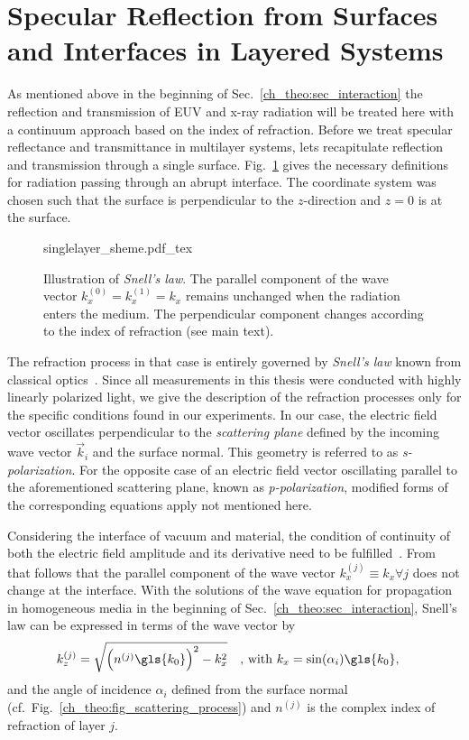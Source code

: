 \section{Specular Reflection from Surfaces and Interfaces in Layered Systems} \label{ch_theo:sec_multilayer}
As mentioned above in the beginning of Sec.~\ref{ch_theo:sec_interaction} the reflection and transmission of EUV and x-ray radiation will be treated here with a continuum approach based on the index of refraction. Before we treat specular reflectance and transmittance in multilayer systems, lets recapitulate reflection and transmission through a single surface. Fig.~\ref{ch_theo:fig_singlelayer_scheme} gives the necessary definitions for radiation passing through an abrupt interface. The coordinate system was chosen such that the surface is perpendicular to the $z$-direction and $z=0$ is at the surface.
\begin{figure}[htb]
    \def\svgwidth{0.57\textwidth}
    {singlelayer_sheme.pdf_tex}
    \caption[Illustration of \emph{Snell's law}.]{Illustration of \emph{Snell's law}. The parallel component of the wave vector $k_x^{(0)} = k_x^{(1)} = k_x$ remains unchanged when the radiation enters the medium. The perpendicular component changes according to the index of refraction (see main text).}
    \label{ch_theo:fig_singlelayer_scheme}
\end{figure}
The refraction process in that case is entirely governed by \emph{Snell's law} known from classical optics~\cite{born_principles_1965}. Since all measurements in this thesis were conducted with highly linearly polarized light, we give the description of the refraction processes only for the specific conditions found in our experiments. In our case, the electric field vector oscillates perpendicular to the \emph{scattering plane} defined by the incoming wave vector $\vec{k}_i$ and the surface normal. This geometry is referred to as \emph{s-polarization}. For the opposite case of an electric field vector oscillating parallel to the aforementioned scattering plane, known as \emph{p-polarization}, modified forms of the corresponding equations apply not mentioned here.

Considering the interface of vacuum and material, the condition of continuity of both the electric field amplitude and its derivative need to be fulfilled~\cite{born_principles_1965, gibaud_specular_2009}. From that follows that the parallel component of the wave vector $k_x^{(j)} \equiv k_x \forall j$ does not change at the interface. With the solutions of the wave equation for propagation in homogeneous media in the beginning of Sec.~\ref{ch_theo:sec_interaction}, Snell's law can be expressed in terms of the wave vector by
\begin{align}
k_z^{(j)} &= \sqrt{\Big(n^{(j)} \gls{k_0}\Big)^2 - k_x^2} \quad \text{, with } k_x = \sin(\alpha_i) \gls{k_0} \text{,} \label{ch_theo:eqn_snells_law}
\end{align}
and the angle of incidence $\alpha_i$ defined from the surface normal (cf.~Fig.~\ref{ch_theo:fig_scattering_process}) and $n^{(j)}$ is the complex index of refraction of layer $j$.


